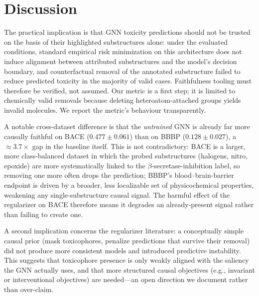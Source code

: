 \documentclass[a4paper,fleqn]{cas-dc}
\begin{document}
\section{Discussion}
The practical implication is that GNN toxicity predictions should not be trusted on the basis of their highlighted substructures alone: under the evaluated conditions, standard empirical risk minimization on this architecture does not induce alignment between attributed substructures and the model's decision boundary, and counterfactual removal of the annotated substructure failed to reduce predicted toxicity in the majority of valid cases. Faithfulness tooling must therefore be verified, not assumed. Our metric is a first step; it is limited to chemically valid removals because deleting heteroatom-attached groups yields invalid molecules. We report the metric's behaviour transparently.

A notable cross-dataset difference is that the \emph{untrained} GNN is already far more causally faithful on BACE ($0.477\pm0.061$) than on BBBP ($0.128\pm0.027$), a $\approx 3.7\times$ gap in the baseline itself. This is not contradictory: BACE is a larger, more class-balanced dataset in which the probed substructures (halogens, nitro, epoxide) are more systematically linked to the $\beta$-secretase-inhibition label, so removing one more often drops the prediction; BBBP's blood--brain-barrier endpoint is driven by a broader, less localizable set of physicochemical properties, weakening any single-substructure causal signal. The harmful effect of the regularizer on BACE therefore means it degrades an already-present signal rather than failing to create one.

A second implication concerns the regularizer literature: a conceptually simple causal prior (mask toxicophores, penalize predictions that survive their removal) did not produce more consistent models and introduced predictive instability. This suggests that toxicophore presence is only weakly aligned with the saliency the GNN actually uses, and that more structured causal objectives (e.g., invariant or interventional objectives) are needed---an open direction we document rather than over-claim.
\end{document}
